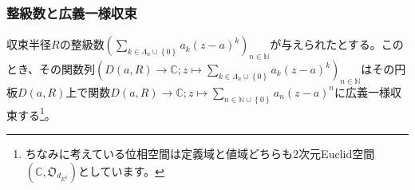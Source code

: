\documentclass[dvipdfmx]{jsarticle}
\begin{document}
\subsubsection{整級数と広義一様収束}%
\begin{thm}\label{4.1.13.10}
収束半径$R$の整級数$\left( \sum_{k \in \varLambda_{n} \cup \left\{ 0 \right\}} {a_{k}(z - a)^{k}} \right)_{n \in \mathbb{N}}$が与えられたとする。このとき、その関数列$\left( D(a,R) \rightarrow \mathbb{C};z \mapsto \sum_{k \in \varLambda_{n} \cup \left\{ 0 \right\}} {a_{k}(z - a)^{k}} \right)_{n \in \mathbb{N}}$はその円板$D(a,R)$上で関数$D(a,R) \rightarrow \mathbb{C};z \mapsto \sum_{n \in \mathbb{N} \cup \left\{ 0 \right\}} {a_{n}(z - a)^{n}}$に広義一様収束する\footnote{ちなみに考えている位相空間は定義域と値域どちらも2次元Euclid空間$\left( \mathbb{C},\mathfrak{O}_{d_{E^{2}}} \right)$としています。}。
\end{thm}
\end{document}
